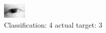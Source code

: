 \begin{figure}[h!]
\begin{center}
\includegraphics[width=0.60\columnwidth]{figures/ID22_class_4_target_3.png}
\end{center}
\caption{ Classification: 4 actual target: 3}
\label{fig:ID22_class_4_target_3}
\end{figure}
